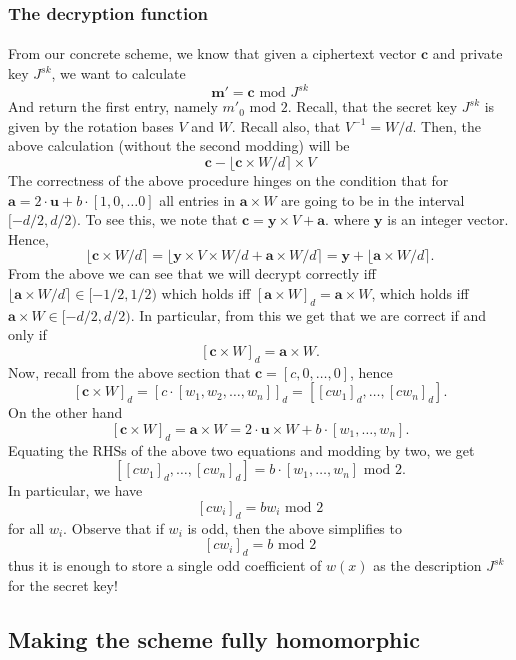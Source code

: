 \documentclass{article}
\theoremstyle{definition}
\theoremstyle{example}
\renewcommand{\mod}{\,\,\text{mod}\,\,}
\renewcommand{\vec}[1]{\mathbf{#1}}
\begin{document}
\subsubsection{The decryption function}
\paragraph{} From our concrete scheme, we know that given a ciphertext vector
$\vec{c}$ and private key $J^{sk}$, we want to calculate
\[
 \vec{m}' = \vec{c} \mod J^{sk}
\]
And return the first entry, namely $m'_0 \mod 2$.
Recall, that the secret key $J^{sk}$ is given by the rotation bases $V$ and $W$.
Recall also, that $V^{-1} = W/d$.
Then, the above calculation (without the second modding) will be
\[
  \vec{c} - \lfloor \vec{c} \times W/d \rceil \times V
\]
The correctness of the above procedure hinges on the condition that for $\vec{a}
= 2 \cdot \vec{u} + b \cdot [1, 0,\hdots 0]$ all entries in $\vec{a} \times
W$ are going to be in the interval $[-d/2, d/2)$. To see this, we note that
$\vec{c} = \vec{y} \times V + \vec{a}$. where $\vec{y}$ is an integer vector.
Hence,
\[
  \lfloor \vec{c} \times W/d \rceil = \lfloor \vec{y} \times V \times W/d +
  \vec{a} \times W/d \rceil = \vec{y} + \lfloor \vec{a} \times W/d \rceil.
\]
From the above we can see that we will decrypt correctly iff $\lfloor \vec{a}
\times W/d \rceil \in [-1/2, 1/2)$ which holds iff $[\vec{a} \times W]_d =
\vec{a} \times W$, which holds iff $\vec{a} \times W \in [-d/2, d/2)$. In
particular, from this we get that we are correct if and only if
\[
  [\vec{c} \times W]_d = \vec{a} \times W.
\]
Now, recall from the above section that $\vec{c} = [c, 0, \hdots, 0]$, hence
\[
  [\vec{c} \times W]_d = [c \cdot [w_1, w_2, \hdots, w_n]]_d = [[cw_1]_d,
  \hdots, [cw_n]_d].
\]
On the other hand
\[
  [\vec{c} \times W]_d = \vec{a} \times W = 2 \cdot \vec{u} \times W + b \cdot
  [w_1, \hdots, w_n].
\]
Equating the RHSs of the above two equations and modding by two, we get
\[
  [[cw_1]_d, \hdots, [cw_n]_d] = b \cdot [w_1, \hdots, w_n] \mod 2.
\]
In particular, we have
\[
  [cw_i]_d = bw_i \mod 2
\]
for all $w_i$. Observe that if $w_i$ is odd, then the above simplifies to
\[
  [cw_i]_d = b \mod 2
\]
thus it is enough to store a single odd coefficient of $w(x)$ as the description
$J^{sk}$ for the secret key!
\subsection{Making the scheme fully homomorphic}
\end{document}
